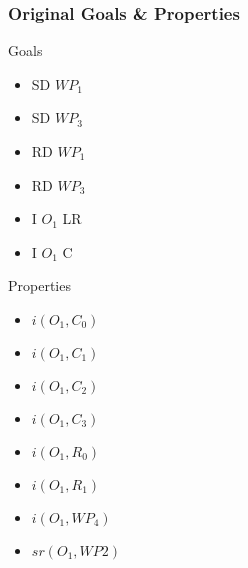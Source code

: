 \subsubsection*{Original Goals \& Properties}
\begin{minipage}[t]{0.45\textwidth}
	Goals
	\begin{itemize}
		\item SD $WP_1$
		\item SD $WP_3$
		\item RD $WP_1$
		\item RD $WP_3$
		\item I $O_1$ LR
		\item I $O_1$ C
	\end{itemize}
\end{minipage}
\begin{minipage}[t]{0.45\textwidth}
	Properties
	\begin{itemize}
		\item $i(O_1, C_0)$
		\item $i(O_1, C_1)$
		\item $i(O_1, C_2)$
		\item $i(O_1, C_3)$
		\item $i(O_1, R_0)$
		\item $i(O_1, R_1)$
		\item $i(O_1, WP_4)$
		\item $sr(O_1, WP2)$
	\end{itemize}
\end{minipage}


